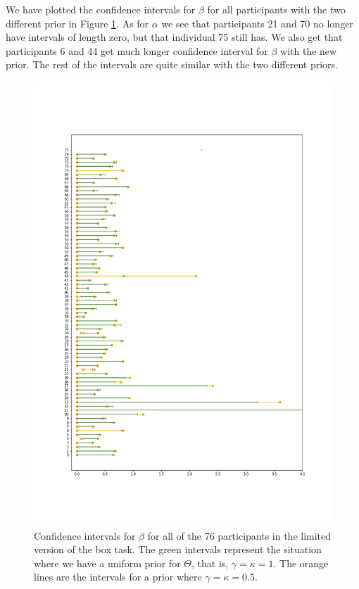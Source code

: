 We have plotted the confidence intervals for $\beta$ for all participants with the two different prior in Figure \ref{fig:sensitivity_ci_lim_beta_zoom}.
As for $\alpha$ we see that participants 21 and 70 no longer have intervals of length zero, but that individual 75 still has. We also get that participants 6 and 44 get much longer confidence interval for $\beta$ with the new prior. The rest of the intervals are quite similar with the two different priors. 
\begin{figure}
    \centering
    \includegraphics[scale=0.37]{pictures/Sensitivity/ci_lim_beta_zoom1.png}
    \caption[CIs for $\beta$ for all participants with two different priors, limited]{Confidence intervals for $\beta$ for all of the 76 participants in the limited version of the box task. The green intervals represent the situation where we have a uniform prior for $\Theta$, that is, $\gamma=\kappa=1$. The orange lines are the intervals for a prior where $\gamma=\kappa=0.5$.}
    \label{fig:sensitivity_ci_lim_beta_zoom}
\end{figure}


